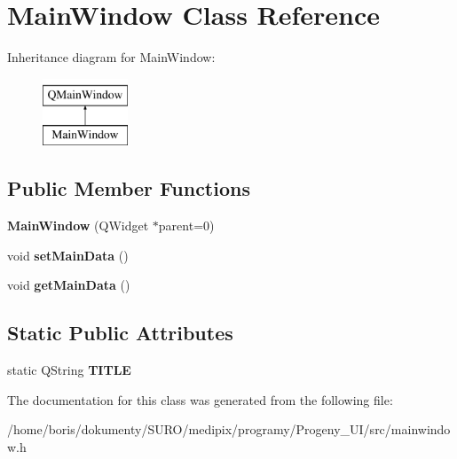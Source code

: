 \hypertarget{classMainWindow}{\section{Main\+Window Class Reference}
\label{classMainWindow}
}
Inheritance diagram for Main\+Window\+:\begin{figure}[H]
\begin{center}
\leavevmode
\includegraphics[height=2.000000cm]{classMainWindow}
\end{center}
\end{figure}
\subsection*{Public Member Functions}
\begin{DoxyCompactItemize}
\item 
\hypertarget{classMainWindow_a8b244be8b7b7db1b08de2a2acb9409db}{{\bfseries Main\+Window} (Q\+Widget $\ast$parent=0)}\label{classMainWindow_a8b244be8b7b7db1b08de2a2acb9409db}

\item 
\hypertarget{classMainWindow_a597a4a602b7ebad94f2eec86a0db7563}{void {\bfseries set\+Main\+Data} ()}\label{classMainWindow_a597a4a602b7ebad94f2eec86a0db7563}

\item 
\hypertarget{classMainWindow_a75ce441f08138eca2ef1665a66870a43}{void {\bfseries get\+Main\+Data} ()}\label{classMainWindow_a75ce441f08138eca2ef1665a66870a43}

\end{DoxyCompactItemize}
\subsection*{Static Public Attributes}
\begin{DoxyCompactItemize}
\item 
\hypertarget{classMainWindow_aa26df84f6e0c27464332427cec49d8a9}{static Q\+String {\bfseries T\+I\+T\+L\+E}}\label{classMainWindow_aa26df84f6e0c27464332427cec49d8a9}

\end{DoxyCompactItemize}


The documentation for this class was generated from the following file\+:\begin{DoxyCompactItemize}
\item 
/home/boris/dokumenty/\+S\+U\+R\+O/medipix/programy/\+Progeny\+\_\+\+U\+I/src/mainwindow.\+h\end{DoxyCompactItemize}
